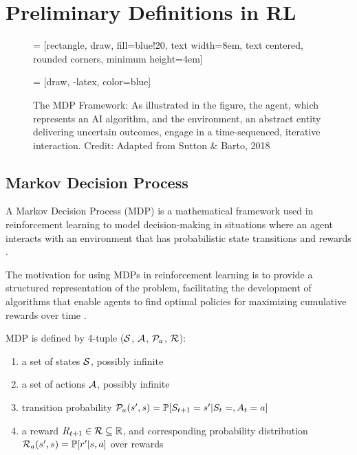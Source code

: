 \section{Preliminary Definitions in RL}
\begin{figure}
    \centering
     = [rectangle, draw, fill=blue!20,
    text width=8em, text centered, rounded corners, minimum height=4em]

     = [draw, -latex, color=blue]

    \caption{The MDP Framework: As illustrated in the figure, the agent, which represents an AI algorithm, and the environment, an abstract entity delivering uncertain outcomes, engage in a time-sequenced, iterative interaction. Credit: Adapted from Sutton \& Barto, 2018 \cite{RL} }
    \label{fig:my_label}
\end{figure}
\subsection{Markov Decision Process}
A Markov Decision Process (MDP) is a mathematical framework used in reinforcement learning to model decision-making in situations where an agent interacts with an environment that has probabilistic state transitions and rewards \cite{Markov}. 

The motivation for using MDPs in reinforcement learning is to provide a structured representation of the problem, facilitating the development of algorithms that enable agents to find optimal policies for maximizing cumulative rewards over time \cite{RL2}.
\begin{definition}
    MDP is defined by 4-tuple ($\mathcal{S}$, $\mathcal A$, $\mathcal P_a$, $\mathcal R$):
    \begin{enumerate}
        \item a set of states $\mathcal{S}$, possibly infinite
        \item a set of actions $\mathcal A$, possibly infinite
        \item  transition probability $\mathcal P_a(s',s) = \mathbb P [S_{t+1} = s'| S_{t} = ,A_{t} = a]$
        \item a reward $R_{t+1} \in \mathcal R \subseteq \mathbb R$, and corresponding probability distribution $ \mathcal R_a(s',s) = \mathbb P[r' | s,a]$ over rewards
    \end{enumerate}
\end{definition}

